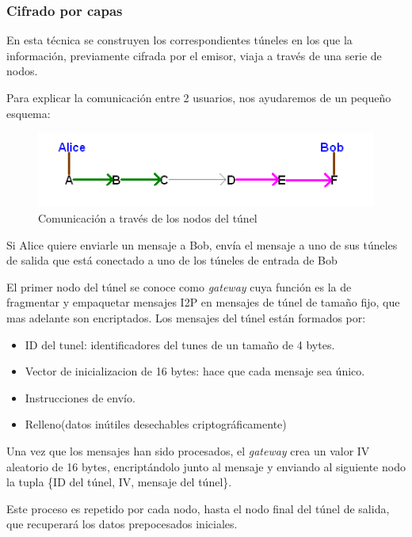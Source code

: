 \subsubsection*{Cifrado por capas}

En esta técnica se construyen los correspondientes túneles en los que la información, previamente cifrada por el emisor,  viaja a través de una serie de nodos.

Para explicar la comunicación entre 2 usuarios, nos ayudaremos de un pequeño esquema: \\


	
\begin{figure}[h]
	\centering
	\includegraphics[width=.8\textwidth]{img/alice_bob_tunnel}
	\caption{Comunicación a través de los nodos del túnel}
\end{figure}

Si Alice quiere enviarle un mensaje a Bob, envía el mensaje a uno de sus túneles de salida que está conectado a uno de los túneles de entrada de Bob


El primer nodo del túnel se conoce como \textit{gateway} cuya función es la de fragmentar y empaquetar mensajes I2P en mensajes de túnel de tamaño fijo, que mas adelante son encriptados. 
Los mensajes del túnel están formados por:

\begin{itemize}
	\item ID del tunel: identificadores del tunes de un tamaño de 4 bytes.
	\item Vector de inicializacion de 16 bytes: hace que cada mensaje sea único.
	\item Instrucciones de envío.
	\item Relleno(datos inútiles desechables criptográficamente)
\end{itemize}

Una vez que los mensajes han sido procesados, el \textit{gateway} crea un valor IV aleatorio de 16 bytes, encriptándolo junto al mensaje y enviando al siguiente nodo la tupla \{ID del túnel, IV, mensaje del túnel\}. 

Este proceso es repetido por cada nodo, hasta el nodo final del túnel de salida, que recuperará los datos prepocesados iniciales.




